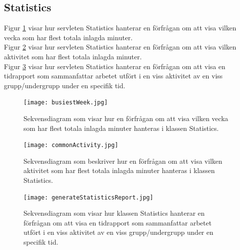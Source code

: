 \documentclass[a4paper]{article}
\begin{document}
\subsection{Statistics}
Figur \ref{busiestWeek} visar hur servleten Statistics hanterar en förfrågan om att visa vilken vecka som har flest totala inlagda minuter.\\
Figur \ref{commonActivity} visar hur servleten Statistics hanterar en förfrågan om att visa vilken aktivitet som har flest totala inlagda minuter.\\
Figur \ref{generateStatisticsReport} visar hur servleten Statistics hanterar en förfrågan om att visa en tidrapport som sammanfattar arbetet utfört i en viss aktivitet av en viss grupp/undergrupp under en specifik tid.

\begin{figure}[h!]
\centering
\texttt{[image: busiestWeek.jpg]}
\caption{Sekvensdiagram som visar hur en förfrågan om att visa vilken vecka som har flest totala inlagda minuter hanteras i klassen Statistics.
\label{busiestWeek}}
\end{figure}

\begin{figure}[h!]
\centering
\texttt{[image: commonActivity.jpg]}
\caption{Sekvensdiagram som beskriver hur en förfrågan om att visa vilken aktivitet som har flest totala inlagda minuter hanteras i klassen Statistics.
\label{commonActivity}}
\end{figure}

\begin{figure}[h!]
\centering
\texttt{[image: generateStatisticsReport.jpg]}
\caption{Sekvensdiagram som visar hur klassen Statistics hanterar en förfrågan om att visa en tidrapport som sammanfattar arbetet utfört i en viss aktivitet av en viss grupp/undergrupp under en specifik tid.
\label{generateStatisticsReport}}
\end{figure}
\end{document}

